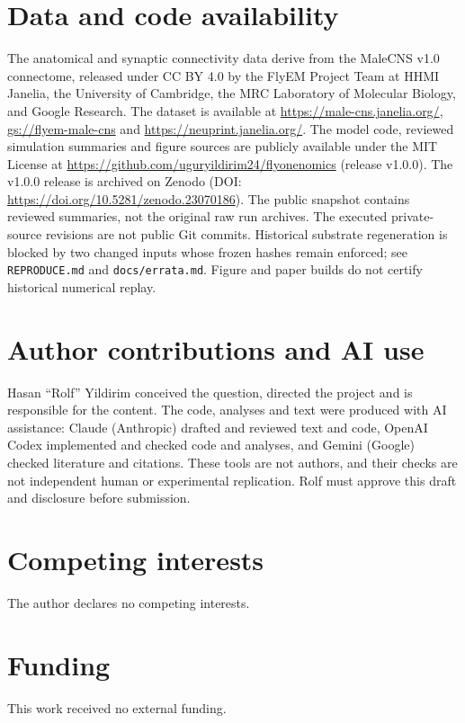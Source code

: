 \documentclass[11pt]{article}
\newif\iffinal
\begin{document}
\section*{Data and code availability}
The anatomical and synaptic connectivity data derive from the MaleCNS v1.0 connectome, released under CC BY 4.0 by the FlyEM Project Team at HHMI Janelia, the University of Cambridge, the MRC Laboratory of Molecular Biology, and Google Research. The dataset is available at \url{https://male-cns.janelia.org/}, \url{gs://flyem-male-cns} and \url{https://neuprint.janelia.org/}. The model code, reviewed simulation summaries and figure sources are publicly available under the MIT License at \url{https://github.com/uguryildirim24/flyonenomics} (release v1.0.0). The v1.0.0 release is archived on Zenodo (DOI: \url{https://doi.org/10.5281/zenodo.23070186}). The public snapshot contains reviewed summaries, not the original raw run archives. The executed private-source revisions are not public Git commits. Historical substrate regeneration is blocked by two changed inputs whose frozen hashes remain enforced; see \texttt{REPRODUCE.md} and \texttt{docs/errata.md}. Figure and paper builds do not certify historical numerical replay.

\section*{Author contributions and AI use}
Hasan ``Rolf'' Yildirim conceived the question, directed the project and is responsible for the content. The code, analyses and text were produced with AI assistance: Claude (Anthropic) drafted and reviewed text and code, OpenAI Codex implemented and checked code and analyses, and Gemini (Google) checked literature and citations. These tools are not authors, and their checks are not independent human or experimental replication. \iffinal\else Rolf must approve this draft and disclosure before submission.\fi

\section*{Competing interests}
The author declares no competing interests.

\section*{Funding}
This work received no external funding.
\end{document}
